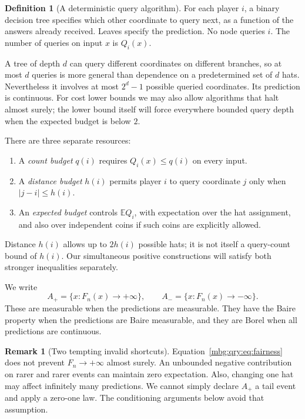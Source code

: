 \documentclass[11pt,letterpaper]{article}
\theoremstyle{definition}
\newtheorem{definition}[theorem]{Definition}
\newtheorem{remark}[theorem]{Remark}
\newcommand{\E}{\mathbb E}
\begin{document}
\begin{definition}[A deterministic query algorithm]
For each player \(i\), a binary decision tree specifies which other
coordinate to query next, as a function of the answers already received.
Leaves specify the prediction. No node queries \(i\). The number of
queries on input \(x\) is \(Q_i(x)\).
\end{definition}

A tree of depth \(d\) can query different coordinates on different
branches, so at most \(d\) queries is more general than dependence
on a predetermined set of \(d\) hats. Nevertheless it involves at most
\(2^d-1\) possible queried coordinates. Its prediction is continuous.
For cost lower bounds we may also allow algorithms that halt almost
surely; the lower bound itself will force everywhere bounded query depth
when the expected budget is below \(2\).

There are three separate resources:
\begin{enumerate}
\item A \emph{count budget} \(q(i)\) requires \(Q_i(x)\le q(i)\) on every
input.
\item A \emph{distance budget} \(h(i)\) permits player \(i\) to query
coordinate \(j\) only when \(|j-i|\le h(i)\).
\item An \emph{expected budget} controls \(\E Q_i\), with expectation over
the hat assignment, and also over independent coins if such coins are
explicitly allowed.
\end{enumerate}
Distance \(h(i)\) allows up to \(2h(i)\) possible hats; it is not itself a
query-count bound of \(h(i)\). Our simultaneous positive constructions
will satisfy both stronger inequalities separately.

We write
\[
 A_+=\{x:F_n(x)\to+\infty\},\qquad
 A_-=\{x:F_n(x)\to-\infty\}.
\]
These are measurable when the predictions are measurable. They have the
Baire property when the predictions are Baire measurable, and they are
Borel when all predictions are continuous.

\begin{remark}[Two tempting invalid shortcuts]
Equation~\eqref{mbg:qry:eq:fairness} does not prevent \(F_n\to+\infty\) almost
surely. An unbounded negative contribution on rarer and rarer events can
maintain zero expectation. Also, changing one hat may affect infinitely
many predictions. We cannot simply declare \(A_+\) a tail event and
apply a zero-one law. The conditioning arguments below avoid that
assumption.
\end{remark}
\end{document}
